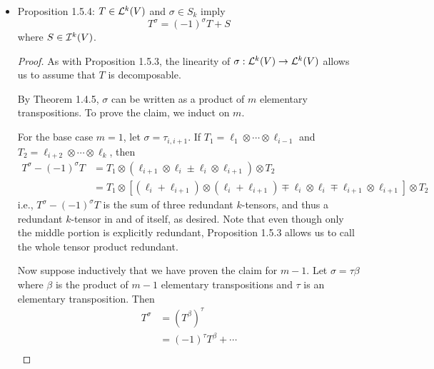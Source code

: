 \documentclass[../notes.tex]{subfiles}
\begin{document}
\begin{itemize}
\begin{proof}
        Let $T=\ell_1\otimes\cdots\otimes\ell_r$ with $\ell_i=\ell_{i+1}$, and let $T'=\ell_1'\otimes\cdots\otimes\ell_s'$. It follows that
        \begin{equation*}
            T\otimes T' = (\ell_1\otimes\cdots\otimes\ell_i\otimes\ell_{i+1}\otimes\cdots\otimes\ell_r)\otimes(\ell_1'\otimes\cdots\otimes\ell_s')
        \end{equation*}
        is redundant and hence in $\ide[r+s]{V}$, as desired. The argument is symmetric for $T'\otimes T$.
    \end{proof}
    \item Proposition 1.5.4: $T\in\lin[k]{V}$ and $\sigma\in S_k$ imply
    \begin{equation*}
        T^\sigma = (-1)^\sigma T+S
    \end{equation*}
    where $S\in\ide[k]{V}$.
    \begin{proof}
        As with Proposition 1.5.3, the linearity of $\sigma:\lin[k]{V}\to\lin[k]{V}$ allows us to assume that $T$ is decomposable.\par
        By Theorem 1.4.5, $\sigma$ can be written as a product of $m$ elementary transpositions. To prove the claim, we induct on $m$.\par
        For the base case $m=1$, let $\sigma=\tau_{i,i+1}$. If $T_1=\ell_1\otimes\cdots\otimes\ell_{i-1}$ and $T_2=\ell_{i+2}\otimes\cdots\otimes\ell_k$, then
        \begin{align*}
            T^\sigma-(-1)^\sigma T &= T_1\otimes(\ell_{i+1}\otimes\ell_i\pm\ell_i\otimes\ell_{i+1})\otimes T_2\\
            &= T_1\otimes[(\ell_i+\ell_{i+1})\otimes(\ell_i+\ell_{i+1})\mp\ell_i\otimes\ell_i\mp\ell_{i+1}\otimes\ell_{i+1}]\otimes T_2
        \end{align*}
        i.e., $T^\sigma-(-1)^\sigma T$ is the sum of three redundant $k$-tensors, and thus a redundant $k$-tensor in and of itself, as desired. Note that even though only the middle portion is explicitly redundant, Proposition 1.5.3 allows us to call the whole tensor product redundant.\par
        Now suppose inductively that we have proven the claim for $m-1$. Let $\sigma=\tau\beta$ where $\beta$ is the product of $m-1$ elementary transpositions and $\tau$ is an elementary transposition. Then
        \begin{align*}
            T^\sigma &= (T^\beta)^\tau\tag*{Proposition 1.4.14(3)}\\
            &= (-1)^\tau T^\beta+\cdots\tag*{Base case}\\

\end{align*}
\end{proof}
\end{itemize}
\end{document}
